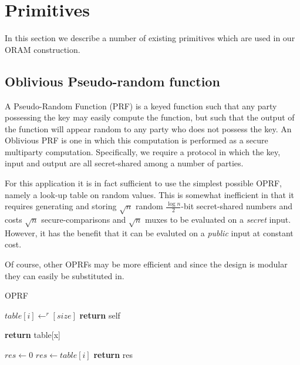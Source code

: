 
\section{Primitives}

In this section we describe a number of existing primitives which are
used in our ORAM construction.

\subsection{Oblivious Pseudo-random function}

A Pseudo-Random Function (PRF) is a keyed function such that
any party possessing the key may easily compute the function,
but such that the output of the function will appear random 
to any party who does not possess the key.
An Oblivious PRF is one in which this computation is performed
as a secure multiparty computation.
Specifically, we require a protocol in which the key, input
and output are all secret-shared among a number of parties.

For this application it is in fact sufficient to use the simplest possible
OPRF, namely a look-up table on random values.
This is somewhat inefficient in that it requires generating and storing 
$\sqrt{n}$ random $\frac{\log{n}}{2}$-bit secret-shared numbers
and costs $\sqrt{n}$ secure-comparisons and 
$\sqrt{n}$ muxes to be evaluated on a \emph{secret} input.
However, it has the benefit that it can be evaluted on a
\emph{public} input at constant cost.

Of course, other OPRFs may be more efficient and since the design
is modular they can easily be substituted in.

\begin{algorithm}
\caption{OPRF}
\label{alg:oprf}
\begin{algorithmic}[1]

 
    \State $table[i] \gets^r [size]$
\EndFor
\State \textbf{return} self
\EndProcedure

\State

 
\State \textbf{return} table[x]
\EndProcedure

\State

\State $res \gets 0$
    \State $res \gets table[i]$
    \EndOblivIf
\EndFor
\State \textbf{return} res
\EndProcedure

\end{algorithmic}
\end{algorithm}


